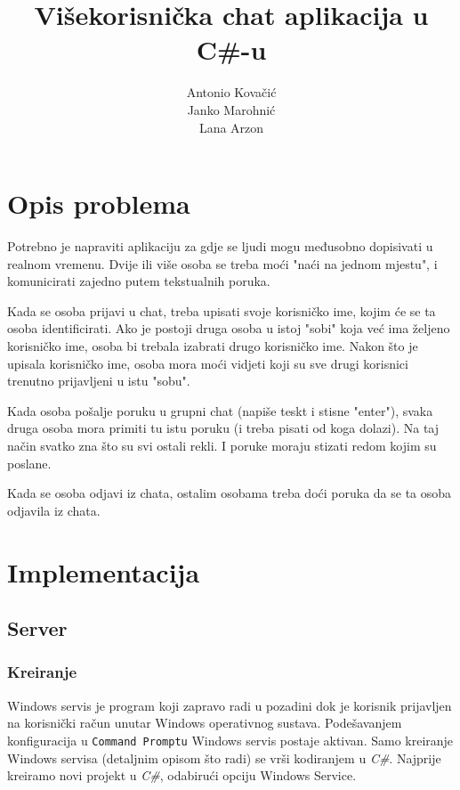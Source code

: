 \documentclass[10pt,a4paper,onecolumn,titlepage]{article}
\title{Višekorisnička chat aplikacija u C\#-u}
\author{Antonio Kovačić\\Janko Marohnić\\Lana Arzon}
\begin{document}
\maketitle

\tableofcontents

\newpage

\section{Opis problema}

Potrebno je napraviti aplikaciju za gdje se ljudi mogu međusobno dopisivati
u realnom vremenu. Dvije ili više osoba se treba moći "naći na jednom mjestu",
i komunicirati zajedno putem tekstualnih poruka.

Kada se osoba prijavi u chat, treba upisati svoje korisničko ime, kojim će se
ta osoba identificirati. Ako je postoji druga osoba u istoj "sobi" koja već
ima željeno korisničko ime, osoba bi trebala izabrati drugo korisničko ime.
Nakon što je upisala korisničko ime, osoba mora moći vidjeti koji su sve drugi
korisnici trenutno prijavljeni u istu "sobu".

Kada osoba pošalje poruku u grupni chat (napiše teskt i stisne "enter"), svaka
druga osoba mora primiti tu istu poruku (i treba pisati od koga dolazi). Na taj
način svatko zna što su svi ostali rekli. I poruke moraju stizati redom kojim
su poslane.

Kada se osoba odjavi iz chata, ostalim osobama treba doći poruka da se ta
osoba odjavila iz chata.

\section{Implementacija}

\subsection{Server}

\subsubsection{Kreiranje}
Windows servis je program koji zapravo radi u pozadini dok je korisnik prijavljen na korisnički račun unutar Windows operativnog sustava. Podešavanjem konfiguracija u \texttt{Command Promptu} Windows servis postaje aktivan. Samo kreiranje Windows servisa (detaljnim opisom što radi) se vrši kodiranjem u \textit{C\#}.
Najprije kreiramo novi projekt u \textit{C\#}, odabirući opciju Windows Service. 
\end{document}

